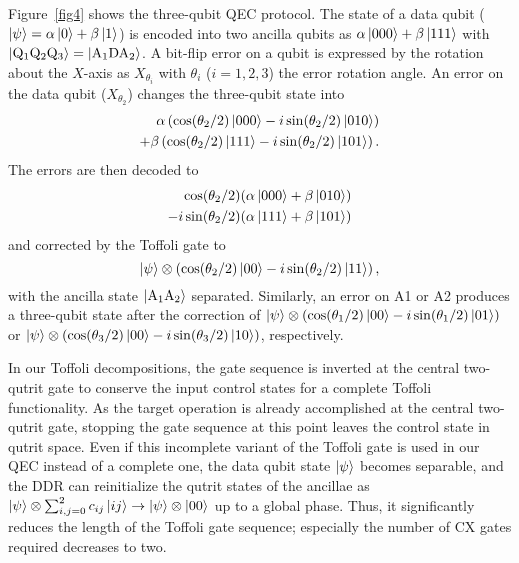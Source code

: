 \documentclass[aps,prl,twocolumn,groupedaddress,superscriptaddress]{revtex4}
\begin{document}
Figure~\ref{fig4} shows the three-qubit QEC protocol.
The state of a data qubit ($\ket{\psi} = \alpha \ket{0} + \beta \ket{1}$) is encoded into two ancilla qubits as $\alpha \ket{000} + \beta \ket{111}$ with $\ket{{\rm Q_1 Q_2 Q_3}}=\ket{{\rm A_1 D A_2}}$.
A bit-flip error on a qubit is expressed by the rotation about the $X$-axis as $X_{\theta_{i}}$ with $\theta_{i}$ ($i=1,2,3$) the error rotation angle.
An error on the data qubit ($X_{\theta_2}$) changes the three-qubit state into
\begin{equation}
\begin{split}
\alpha \left(\cos({\theta_2/2}) \ket{000} - i\sin({\theta_2/2})\ket{010} \right) \\+ \beta \left(\cos({\theta_2/2})\ket{111} - i\sin({\theta_2/2})\ket{101} \right).
\end{split}
\end{equation}
The errors are then decoded to
\begin{equation}
\begin{split}
\cos({\theta_2/2}) (\alpha \ket{000} + \beta \ket{010}) \\-i\sin({\theta_2/2}) (\alpha \ket{111} + \beta \ket{101})
\end{split}
\end{equation}
and corrected by the Toffoli gate to
\begin{equation}
\ket{\psi} \otimes \left(\cos({\theta_2/2})\ket{00} -i\sin({\theta_2/2})\ket{11} \right),
\end{equation}
with the ancilla state $\ket{{\rm A_1 A_2}}$ separated.
Similarly, an error on A1 or A2 produces a three-qubit state after the correction of $\ket{\psi} \otimes \left(\cos({\theta_1/2})\ket{00} -i\sin({\theta_1/2})\ket{01} \right)$ or $\ket{\psi} \otimes \left(\cos({\theta_3/2})\ket{00} -i\sin({\theta_3/2})\ket{10} \right)$, respectively.

In our Toffoli decompositions, the gate sequence is inverted at the central two-qutrit gate to conserve the input control states for a complete Toffoli functionality.
As the target operation is already accomplished at the central two-qutrit gate, stopping the gate sequence at this point leaves the control state in qutrit space.
Even if this incomplete variant of the Toffoli gate is used in our QEC instead of a complete one, the data qubit state $\ket{\psi}$ becomes separable, and the DDR can reinitialize the qutrit states of the ancillae as $\ket{\psi} \otimes \sum_{i,j=0}^2 c_{ij} \ket{ij} \rightarrow \ket{\psi} \otimes \ket{00}$ up to a global phase.
Thus, it significantly reduces the length of the Toffoli gate sequence; especially the number of CX gates required decreases to two.
\end{document}

